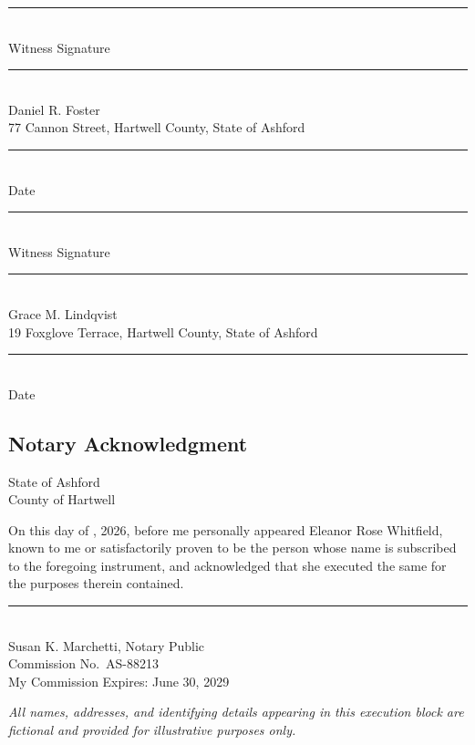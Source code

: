 \vspace{5pt}
\noindent
\begin{minipage}[t]{0.46\linewidth}
\rule{0.9\linewidth}{0.5pt}\\[2pt]
Witness Signature\\[5pt]
\rule{0.9\linewidth}{0.5pt}\\[2pt]
Daniel R. Foster\\[2pt]
{\small 77 Cannon Street, Hartwell County, State of Ashford}\\[4pt]
\rule{0.9\linewidth}{0.5pt}\\[2pt]
Date
\end{minipage}\hfill
\begin{minipage}[t]{0.46\linewidth}
\rule{0.9\linewidth}{0.5pt}\\[2pt]
Witness Signature\\[5pt]
\rule{0.9\linewidth}{0.5pt}\\[2pt]
Grace M. Lindqvist\\[2pt]
{\small 19 Foxglove Terrace, Hartwell County, State of Ashford}\\[4pt]
\rule{0.9\linewidth}{0.5pt}\\[2pt]
Date
\end{minipage}
\par

\subsection{Notary Acknowledgment}

\noindent
\begin{minipage}[t]{0.62\linewidth}
State of Ashford\\
County of Hartwell

\vspace{4pt}
On this \underline{\hspace{2.2cm}} day of \underline{\hspace{2.6cm}}, 2026, before me personally appeared Eleanor Rose Whitfield, known to me or satisfactorily proven to be the person whose name is subscribed to the foregoing instrument, and acknowledged that she executed the same for the purposes therein contained.

\vspace{5pt}
\rule{0.85\linewidth}{0.5pt}\\[2pt]
Susan K. Marchetti, Notary Public\\
Commission No.\ AS-88213\\
My Commission Expires: June 30, 2029
\end{minipage}\hfill
\begin{minipage}[t]{0.3\linewidth}
\centering
{}
\end{minipage}
\par

\vspace{6pt}
{\scriptsize\color{willslate}\itshape All names, addresses, and identifying details appearing in this execution block are fictional and provided for illustrative purposes only.}
